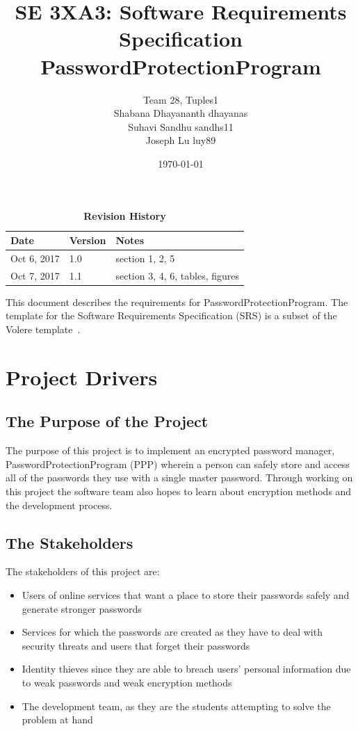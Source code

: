 \documentclass[12pt, titlepage]{article}
\title{SE 3XA3: Software Requirements Specification\\PasswordProtectionProgram}
\author{Team 28, Tuples1
		\\ Shabana Dhayananth dhayanas
		\\  Suhavi Sandhu sandhs11
		\\ Joseph Lu luy89
}
\date{\today}
\begin{document}
\maketitle

\tableofcontents
\listoftables
\listoffigures

\begin{table}[bp]
\caption{\bf Revision History}
\begin{tabularx}{\textwidth}{p{3cm}p{2cm}X}
\toprule {\bf Date} & {\bf Version} & {\bf Notes}\\
\midrule
Oct 6, 2017 & 1.0 & section 1, 2, 5 \\
Oct 7, 2017 & 1.1 & section 3, 4, 6, tables, figures \\
\bottomrule
\end{tabularx}
\end{table}

\newpage


This document describes the requirements for PasswordProtectionProgram.  The template for the Software
Requirements Specification (SRS) is a subset of the Volere
template~\cite{RobertsonAndRobertson2012}.

\section{Project Drivers}

\subsection{The Purpose of the Project}

The purpose of this project is to implement an encrypted password manager, PasswordProtectionProgram (PPP) wherein a person can 
safely store and access all of the passwords they use with a single master password. Through working on this project the software 
team also hopes to learn about encryption methods and the development process.

\subsection{The Stakeholders}

The stakeholders of this project are:
\begin{itemize}
\item Users of online services that want a place to store their passwords safely and generate stronger passwords
\item Services for which the passwords are created as they have to deal with security threats and users that forget their passwords
\item Identity thieves since they are able to breach users’ personal information due to weak passwords and weak encryption methods
\item The development team, as they are the students attempting to solve the problem at hand
\end{itemize}
\end{document}
